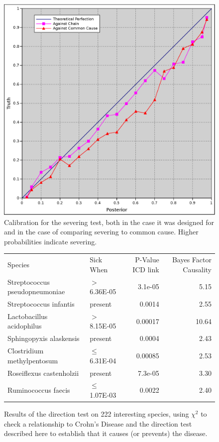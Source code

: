 \documentclass[twocolumn,12pt]{article}
\begin{document}
\begin{figure}
  \includegraphics[width=\textwidth]{sever}
  \caption{Calibration for the severing test, both in the case it was
    designed for and in the case of comparing severing to common
    cause.  Higher probabilities indicate severing.}
  \label{sever}
\end{figure}

\begin{figure}
  \begin{tabular}{llrr}
    Species & Sick When & P-Value ICD link & Bayes Factor Causality \\
    Streptococcus pseudopneumoniae & $>$6.36E-05 & 3.1e-05 & 5.15 \\
    Streptococcus infantis & present & 0.0014 & 2.55 \\
    Lactobacillus acidophilus & $>$8.15E-05 & 0.00017 & 10.64 \\
    Sphingopyxis alaskensis & present & 0.0004 & 2.43 \\
    Clostridium methylpentosum & $\leq$6.31E-04 & 0.00085 & 2.53 \\
    Roseiflexus castenholzii & present & 7.3e-05 & 3.30 \\
    Ruminococcus faecis & $\leq$1.07E-03 & 0.0022 & 2.40 \\
  \end{tabular}
  \caption{Results of the direction test on 222 interesting species,
    using $\chi^2$ to check a relationship to Crohn's Disease and the
    direction test described here to establish that it causes (or
    prevents) the disease.}
  \label{dir_tab}
\end{figure}
\end{document}

